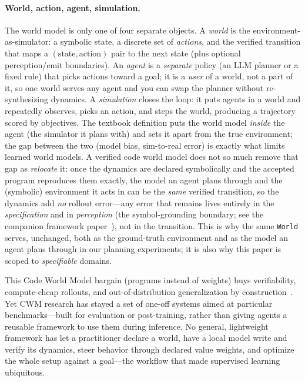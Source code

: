 \documentclass[11pt]{article}
\begin{document}
\paragraph{World, action, agent, simulation.} The world model is only one of four separate
objects. A \emph{world} is the
environment-as-simulator: a symbolic state, a discrete set of \emph{actions}, and
the verified transition that maps a $(\textrm{state}, \textrm{action})$ pair to the
next state (plus optional perception/emit boundaries). An \emph{agent} is a
\emph{separate} policy (an LLM planner or a fixed rule) that picks actions
toward a goal; it is a \emph{user} of a world, not a part of it, so one world serves
any agent and you can swap the planner without re-synthesizing dynamics. A
\emph{simulation} closes the loop: it puts agents in a world and repeatedly
observes, picks an action, and steps the world, producing a trajectory scored by
objectives. The textbook definition puts the world model \emph{inside} the agent
(the simulator it plans with) and sets it apart from the true environment; the
gap between the two (model bias, sim-to-real error) is exactly what limits learned
world models. A verified code world model does not so much remove that gap as
\emph{relocate} it: once the dynamics are declared symbolically and the accepted
program reproduces them exactly, the model an agent plans through and the (symbolic)
environment it acts in can be the \emph{same} verified transition, so the dynamics add
\emph{no} rollout
error---any error that remains lives entirely in the \emph{specification} and in
\emph{perception} (the symbol-grounding boundary; see the companion framework paper~\cite{openworld_framework}),
not in the transition. This is why the same \texttt{World} serves, unchanged,
both as the ground-truth environment and as the model an agent plans
through in our planning experiments; it is also why this paper is scoped to
\emph{specifiable} domains.

This Code World Model bargain (programs instead of weights) buys verifiability,
compute-cheap rollouts,
and out-of-distribution generalization by construction~\cite{worldcoder2024,
gifmcts2024, poeworld2025, cwmgames2025}. Yet CWM research has stayed a set
of one-off systems aimed at particular benchmarks---built for evaluation or
post-training, rather than giving agents a reusable framework to use them during
inference. No general,
lightweight framework has let a practitioner declare a world, have a
local model write and verify its dynamics, steer behavior through declared
value weights, and optimize the whole setup against a goal---the
workflow that made supervised learning ubiquitous.
\end{document}
